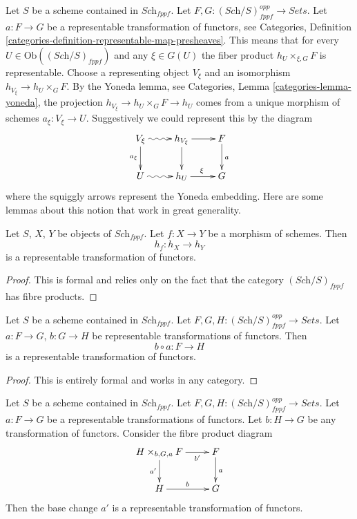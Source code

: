 \noindent
Let $S$ be a scheme contained in $\textit{Sch}_{fppf}$.
Let $F, G : (\textit{Sch}/S)_{fppf}^{opp} \to \textit{Sets}$.
Let $a : F \to G$ be a representable transformation of functors, see
Categories,
Definition \ref{categories-definition-representable-map-presheaves}.
This means that for every
$U \in \text{Ob}((\textit{Sch}/S)_{fppf})$ and
any $\xi \in G(U)$ the fiber product $h_U \times_{\xi, G} F$ is representable.
Choose a representing object $V_\xi$ and an isomorphism
$h_{V_\xi} \to h_U \times_G F$.
By the Yoneda lemma, see Categories, Lemma \ref{categories-lemma-yoneda},
the projection $h_{V_\xi} \to h_U \times_G F \to h_U$ comes from a unique
morphism of schemes $a_\xi : V_\xi \to U$.
Suggestively we could represent this by the diagram
$$
\xymatrix{
V_\xi \ar@{~>}[r] \ar[d]_{a_\xi} & h_{V_\xi} \ar[d] \ar[r] & F \ar[d]^a \\
U \ar@{~>}[r] & h_U \ar[r]^\xi & G
}
$$
where the squiggly arrows represent the Yoneda embedding.
Here are some lemmas about this notion that work in great generality.

\begin{lemma}
\label{lemma-morphism-schemes-gives-representable-transformation}
Let $S$, $X$, $Y$ be objects of $\textit{Sch}_{fppf}$.
Let $f : X \to Y$ be a morphism of schemes.
Then
$$
h_f : h_X \longrightarrow h_Y
$$
is a representable transformation of functors.
\end{lemma}

\begin{proof}
This is formal and relies only on the fact that
the category $(\textit{Sch}/S)_{fppf}$ has fibre products.
\end{proof}

\begin{lemma}
\label{lemma-composition-representable-transformations}
Let $S$ be a scheme contained in $\textit{Sch}_{fppf}$.
Let $F, G, H : (\textit{Sch}/S)_{fppf}^{opp} \to \textit{Sets}$.
Let $a : F \to G$, $b : G \to H$ be representable transformations of functors.
Then
$$
b \circ a : F \longrightarrow H
$$
is a representable transformation of functors.
\end{lemma}

\begin{proof}
This is entirely formal and works in any category.
\end{proof}

\begin{lemma}
\label{lemma-base-change-representable-transformations}
Let $S$ be a scheme contained in $\textit{Sch}_{fppf}$.
Let $F, G, H : (\textit{Sch}/S)_{fppf}^{opp} \to \textit{Sets}$.
Let $a : F \to G$ be a representable transformations of functors.
Let $b : H \to G$ be any transformation of functors.
Consider the fibre product diagram
$$
\xymatrix{
H \times_{b, G, a} F \ar[r]_-{b'} \ar[d]_{a'} & F \ar[d]^a \\
H \ar[r]^b & G
}
$$
Then the base change $a'$ is a representable transformation of functors.
\end{lemma}

